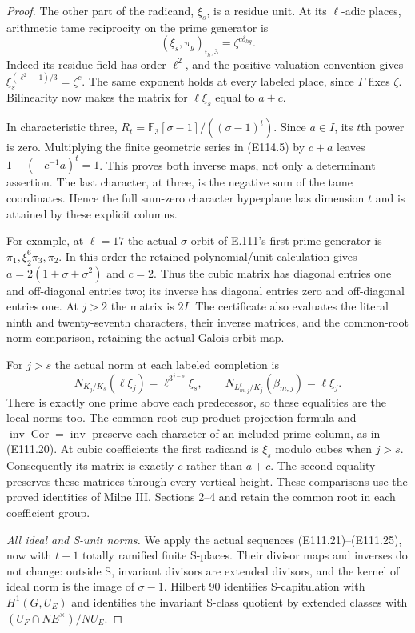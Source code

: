 \begin{proof}
The other part of the radicand, $\xi_s$, is a residue
unit. At its $\ell$-adic places, arithmetic tame
reciprocity on the prime generator is
\[
             (\xi_s,\pi_g)_{\mathfrak t_h,3}
                      =\zeta^{c\delta_{hg}}.
 \tag{E114.13}
\]
Indeed its residue field has order $\ell^2$, and the
positive valuation convention gives
$\xi_s^{(\ell^2-1)/3}=\zeta^c$.
The same exponent holds at every labeled place, since
$\Gamma$ fixes $\zeta$. Bilinearity now makes the
matrix for $\ell\xi_s$ equal to $a+c$.

In characteristic three,
$R_t=\mathbb F_3[\sigma-1]/((\sigma-1)^t)$.
Since $a\in I$, its $t$th power is zero. Multiplying
the finite geometric series in (E114.5) by $c+a$
leaves $1-(-c^{-1}a)^t=1$. This proves both inverse
maps, not only a determinant assertion. The last
character, at three, is the negative sum of the tame
coordinates. Hence the full sum-zero character
hyperplane has dimension $t$ and is attained by
these explicit columns.

For example, at $\ell=17$ the actual $\sigma$-orbit
of E.111's first prime generator is
$\pi_1,\xi_2^6\pi_3,\pi_2$.
In this order the retained polynomial/unit calculation
gives $a=2(1+\sigma+\sigma^2)$ and $c=2$.
Thus the cubic matrix has diagonal entries one and
off-diagonal entries two; its inverse has diagonal
entries zero and off-diagonal entries one. At $j>2$
the matrix is $2I$. The certificate also evaluates
the literal ninth and twenty-seventh characters,
their inverse matrices, and the common-root norm
comparison, retaining the actual Galois orbit map.

For $j>s$ the actual norm at each labeled completion is
\[
 N_{K_j/K_s}(\ell\xi_j)=\ell^{3^{j-s}}\xi_s,
 \qquad N_{L^{\ell}_{m,j}/K_j}(\beta_{m,j})=\ell\xi_j.
 \tag{E114.14}
\]
There is exactly one prime above each predecessor, so
these equalities are the local norms too. The common-root
cup-product projection formula and
$\operatorname{inv}\operatorname{Cor}=\operatorname{inv}$
preserve each character of an included prime column,
as in (E111.20). At cubic coefficients the first
radicand is $\xi_s$ modulo cubes when $j>s$.
Consequently its matrix is exactly $c$ rather than
$a+c$. The second equality preserves these matrices
through every vertical height. These comparisons use
the proved identities of Milne III, Sections 2--4
\cite{E_MilneCFT} and retain the common root in each
coefficient group.

\emph{All ideal and S-unit norms.}
We apply the actual sequences (E111.21)--(E111.25),
now with $t+1$ totally ramified finite S-places.
Their divisor maps and inverses do not change:
outside S, invariant divisors are extended divisors,
and the kernel of ideal norm is the image of
$\sigma-1$. Hilbert 90 identifies S-capitulation with
$H^1(G,U_E)$ and identifies the invariant S-class
quotient by extended classes with
$(U_F\cap NE^\times)/NU_E$.


\end{proof}
